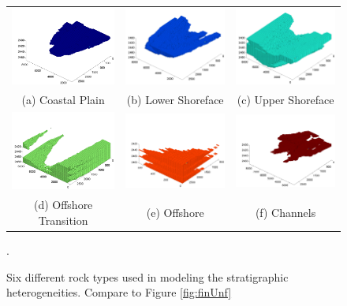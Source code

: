 \begin{figure}
\begin{tabular}{ccc}
\includegraphics[width=0.3 \linewidth,natwidth=542bp,natheight=401bp]{./figurer/facies_1.pdf}&
\includegraphics[width=0.3 \linewidth,natwidth=524bp,natheight=397bp]{./figurer/facies_2.pdf}&
\includegraphics[width=0.3 \linewidth,natwidth=524bp,natheight=397bp]{./figurer/facies_3.pdf}\\(a) Coastal Plain&(b) Lower Shoreface&(c) Upper Shoreface\\
\includegraphics[width=0.3 \linewidth,natwidth=524bp,natheight=397bp]{./figurer/facies_4.pdf}&
\includegraphics[width=0.3 \linewidth,natwidth=553bp,natheight=411bp]{./figurer/facies_5.pdf}&
\includegraphics[width=0.3 \linewidth,natwidth=542bp,natheight=399bp]{./figurer/facies_6.pdf}\\(d) Offshore Transition&(e) Offshore&(f) Channels
\end{tabular}
\caption{Six different rock types used in modeling the stratigraphic heterogeneities. Compare to Figure \ref{fig:finUnf}}.
\label{fig:facies}
\end{figure}

